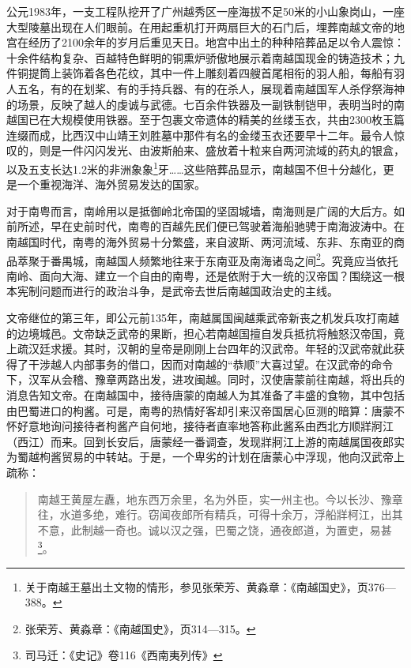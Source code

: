 公元1983年，一支工程队挖开了广州越秀区一座海拔不足50米的小山象岗山，一座大型陵墓出现在人们眼前。在用起重机打开两扇巨大的石门后，埋葬南越文帝的地宫在经历了2100余年的岁月后重见天日。地宫中出土的种种陪葬品足以令人震惊：十余件结构复杂、百越特色鲜明的铜熏炉骄傲地展示着南越国现金的铸造技术；九件铜提筒上装饰着各色花纹，其中一件上雕刻着四艘首尾相衔的羽人船，每船有羽人五名，有的在划桨、有的手持兵器、有的在杀人，展现着南越国军人杀俘祭海神的场景，反映了越人的虔诚与武德。七百余件铁器及一副铁制铠甲，表明当时的南越国已在大规模使用铁器。至于包裹文帝遗体的精美的丝缕玉衣，共由2300枚玉篇连缀而成，比西汉中山靖王刘胜墓中那件有名的金缕玉衣还要早十二年。最令人惊叹的，则是一件闪闪发光、由波斯舶来、盛放着十粒来自两河流域的药丸的银盒，以及五支长达1.2米的非洲象象\footnote{ 关于南越王墓出土文物的情形，参见张荣芳、黄淼章：《南越国史》，页376—388。}牙……这些陪葬品显示，南越国不但十分越化，更是一个重视海洋、海外贸易发达的国家。

对于南粤而言，南岭用以是抵御岭北帝国的坚固城墙，南海则是广阔的大后方。如前所述，早在史前时代，南粤的百越先民们便已驾驶着海船驰骋于南海波涛中。在南越国时代，南粤的海外贸易十分繁盛，来自波斯、两河流域、东非、东南亚的商品萃聚于番禺城，南越国人频繁地往来于东南亚及南海诸岛之间\footnote{ 张荣芳、黄淼章：《南越国史》，页314—315。}。究竟应当依托南岭、面向大海、建立一个自由的南粤，还是依附于大一统的汉帝国？围绕这一根本宪制问题而进行的政治斗争，是武帝去世后南越国政治史的主线。

文帝继位的第三年，即公元前135年，南越属国闽越乘武帝新丧之机发兵攻打南越的边境城邑。文帝缺乏武帝的果断，担心若南越国擅自发兵抵抗将触怒汉帝国，竟上疏汉廷求援。其时，汉朝的皇帝是刚刚上台四年的汉武帝。年轻的汉武帝就此获得了干涉越人内部事务的借口，因而对南越的“恭顺”大喜过望。在汉武帝的命令下，汉军从会稽、豫章两路出发，进攻闽越。同时，汉使唐蒙前往南越，将出兵的消息告知文帝。在南越国中，接待唐蒙的南越人为其准备了丰盛的食物，其中包括由巴蜀进口的枸酱。可是，南粤的热情好客却引来汉帝国居心叵测的暗算：唐蒙不怀好意地询问接待者枸酱产自何地，接待者直率地答称此酱系由西北方顺牂牁江（西江）而来。回到长安后，唐蒙经一番调查，发现牂牁江上游的南越属国夜郎实为蜀越枸酱贸易的中转站。于是，一个卑劣的计划在唐蒙心中浮现，他向汉武帝上疏称：

\begin{quote}
	南越王黄屋左纛，地东西万余里，名为外臣，实一州主也。今以长沙、豫章往，水道多绝，难行。窃闻夜郎所有精兵，可得十余万，浮船牂柯江，出其不意，此制越一奇也。诚以汉之强，巴蜀之饶，通夜郎道，为置吏，易甚\footnote{ 司马迁：《史记》卷116《西南夷列传》}。
\end{quote}

